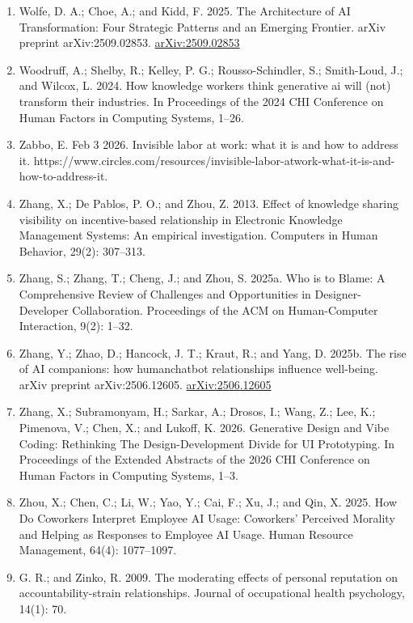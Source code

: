 \documentclass[11pt]{article}
\begin{document}
\begin{enumerate}[leftmargin=*]
  \item Wolfe, D. A.; Choe, A.; and Kidd, F. 2025. The Architecture of AI Transformation: Four Strategic Patterns and an Emerging Frontier. arXiv preprint arXiv:2509.02853. \href{https://arxiv.org/abs/2509.02853}{arXiv:2509.02853}
  \item Woodruff, A.; Shelby, R.; Kelley, P. G.; Rousso-Schindler, S.; Smith-Loud, J.; and Wilcox, L. 2024. How knowledge workers think generative ai will (not) transform their industries. In Proceedings of the 2024 CHI Conference on Human Factors in Computing Systems, 1–26.
  \item Zabbo, E. Feb 3 2026. Invisible labor at work: what it is and how to address it. https://www.circles.com/resources/invisible-labor-atwork-what-it-is-and-how-to-address-it.
  \item Zhang, X.; De Pablos, P. O.; and Zhou, Z. 2013. Effect of knowledge sharing visibility on incentive-based relationship in Electronic Knowledge Management Systems: An empirical investigation. Computers in Human Behavior, 29(2): 307–313.
  \item Zhang, S.; Zhang, T.; Cheng, J.; and Zhou, S. 2025a. Who is to Blame: A Comprehensive Review of Challenges and Opportunities in Designer-Developer Collaboration. Proceedings of the ACM on Human-Computer Interaction, 9(2): 1–32.
  \item Zhang, Y.; Zhao, D.; Hancock, J. T.; Kraut, R.; and Yang, D. 2025b. The rise of AI companions: how humanchatbot relationships influence well-being. arXiv preprint arXiv:2506.12605. \href{https://arxiv.org/abs/2506.12605}{arXiv:2506.12605}
  \item Zhang, X.; Subramonyam, H.; Sarkar, A.; Drosos, I.; Wang, Z.; Lee, K.; Pimenova, V.; Chen, X.; and Lukoff, K. 2026. Generative Design and Vibe Coding: Rethinking The Design-Development Divide for UI Prototyping. In Proceedings of the Extended Abstracts of the 2026 CHI Conference on Human Factors in Computing Systems, 1–3.
  \item Zhou, X.; Chen, C.; Li, W.; Yao, Y.; Cai, F.; Xu, J.; and Qin, X. 2025. How Do Coworkers Interpret Employee AI Usage: Coworkers’ Perceived Morality and Helping as Responses to Employee AI Usage. Human Resource Management, 64(4): 1077–1097.
  \item G. R.; and Zinko, R. 2009. The moderating effects of personal reputation on accountability-strain relationships. Journal of occupational health psychology, 14(1): 70.
\end{enumerate}

% 
% 
\end{document}
